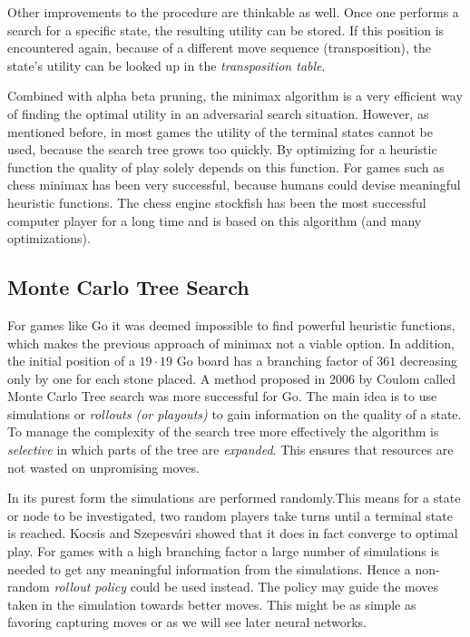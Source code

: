 Other improvements to the procedure are thinkable as well. Once one performs a search for a specific state, the resulting utility can be stored. If this position is encountered again, because of a different move sequence (transposition), the state's utility can be looked up in the \textit{transposition table}.

Combined with alpha beta pruning, the minimax algorithm is a very efficient way of finding the optimal utility in an adversarial search situation. However, as mentioned before, in most games the utility of the terminal states cannot be used, because the search tree grows too quickly. By optimizing for a heuristic function the quality of play solely depends on this function. For games such as chess minimax has been very successful, because humans could devise meaningful heuristic functions. The chess engine stockfish has been the most successful computer player for a long time and is based on this algorithm (and many optimizations). \cite{noauthor_stockfish_2021, noauthor_stockfish_nodate}

\subsection{Monte Carlo Tree Search}
For games like Go it was deemed impossible to find powerful heuristic functions, which makes the previous approach of minimax not a viable option. In addition, the initial position of a $19 \cdot 19$ Go board has a branching factor of $361$ decreasing only by one for each stone placed. A method proposed in 2006 by Coulom \cite{coulom_efficient_2007} called Monte Carlo Tree search was more successful for Go. The main idea is to use simulations or \textit{rollouts (or playouts)} to gain information on the quality of a state. To manage the complexity of the search tree more effectively the algorithm is \textit{selective} in which parts of the tree are \textit{expanded}. This ensures that resources are not wasted on unpromising moves.

In its purest form the simulations are performed randomly.This means for a state or node to be investigated, two random players take turns until a terminal state is reached. Kocsis and Szepesvári \cite{kocsis_bandit_2006} showed that it does in fact converge to optimal play. For games with a high branching factor a large number of simulations is needed to get any meaningful information from the simulations. Hence a non-random \textit{rollout policy} could be used instead. The policy may guide the moves taken in the simulation towards better moves. This might be as simple as favoring capturing moves or as we will see later neural networks.

